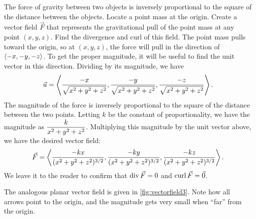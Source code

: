 \begin{example}\label{ex_vectorfield3}%
The force of gravity between two objects is inversely proportional to the square of the distance between the objects. Locate a point mass at the origin. Create a vector field $\vec F$ that represents the gravitational pull of the point mass at any point $(x,y,z)$. Find the divergence and curl of this field.
\solution
The point mass pulls toward the origin, so at $(x,y,z)$, the force will pull in the direction of $\left\langle -x, -y, -z\right\rangle$. To get the proper magnitude, it will be useful to find the unit vector in this direction. Dividing by its magnitude, we have
\[
\vec u
= \left\langle \frac{-x}{\sqrt{x^2+y^2+z^2}}, \frac{-y}{\sqrt{x^2+y^2+z^2}},\frac{-z}{\sqrt{x^2+y^2+z^2}}\right\rangle.
\]
The magnitude of the force is inversely proportional to the square of the distance between the two points. Letting $k$ be the constant of proportionality, we have the magnitude as $\displaystyle\frac{k}{x^2+y^2+z^2}$. Multiplying this magnitude by the unit vector above, we have the desired vector field:
%
%
\[
\vec F
=\left\langle \frac{-kx}{(x^2+y^2+z^2)^{3/2}}, \frac{-ky}{(x^2+y^2+z^2)^{3/2}},\frac{-kz}{(x^2+y^2+z^2)^{3/2}}\right\rangle.
\]
We leave it to the reader to confirm that $\operatorname{div} \vec F = 0$ and $\operatorname{curl} \vec F = \vec 0$.

The analogous planar vector field is given in \autoref{fig:vectorfield3}. Note how all arrows point to the origin, and the magnitude gets very small when ``far'' from the origin.
\end{example}

